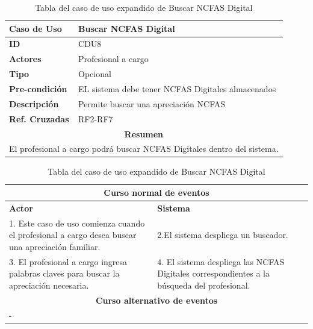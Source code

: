 \begin{table}
	\centering
	\begin{tabular}{|p{6cm} |p{6cm}|}
		\hline \textbf{Caso de Uso} & Buscar NCFAS Digital \\ 
		\hline \textbf{ID} & CDU8 \\ 
		\hline \textbf{Actores} & Profesional a cargo \\ 
		\hline \textbf{Tipo} & Opcional \\ 
		\hline \textbf{Pre-condición} & EL sistema debe tener NCFAS Digitales almacenados \\ 
		\hline \textbf{Descripción} & Permite buscar una apreciación NCFAS \\
		\hline \textbf{Ref. Cruzadas} & RF2-RF7 \\ 
		\hline
		\multicolumn{2}{|c|}{\textbf{Resumen}} \\
		\hline
		\multicolumn{2}{|p{12cm}|}{El profesional a cargo podrá buscar NCFAS Digitales dentro del sistema.} \\
		\hline 
	\end{tabular}  
	\begin{tabular}{|p{6cm}|p{6cm}|}
		\multicolumn{2}{|c|}{\textbf{Curso normal de eventos}} \\
		\hline \textbf{Actor} & \textbf{Sistema} \\ 
		\hline 1. Este caso de uso comienza cuando el profesional a cargo desea buscar una apreciación familiar. & 2.El sistema despliega un buscador.  \\ 
		3. El profesional a cargo ingresa palabras claves para buscar la apreciación necesaria.& 4. El sistema despliega las NCFAS Digitales correspondientes a la búsqueda del profesional. \\
		\hline
		\multicolumn{2}{|c|}{\textbf{Curso alternativo de eventos}} \\
		\hline
		\multicolumn{2}{|p{12cm}|}{ - } \\
		\hline
	\end{tabular}
	\caption{Tabla del caso de uso expandido de Buscar NCFAS Digital}
	\label{tabcdu8}
\end{table}

\newpage
\clearpage

